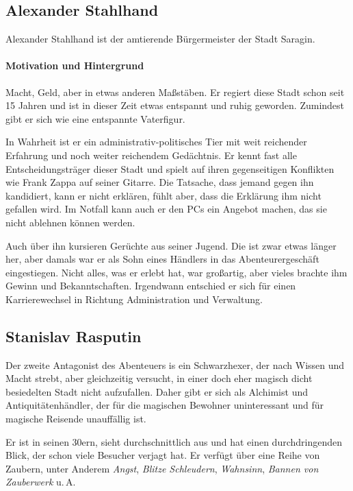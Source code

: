 \documentclass[a4paper,10pt]{scrartcl}
\begin{document}
\bestiarium[name=Viktor Bragin, mag=false, typ=Mensch, grad=5,
In=m85, LP=28, AP=40, St=75, Gw=70]{}

\subsection{Alexander Stahlhand}

Alexander Stahlhand ist der amtierende Bürgermeister der Stadt Saragin. 

\paragraph{Motivation und Hintergrund} Macht, Geld, aber in etwas
anderen Maßstäben. Er regiert diese Stadt schon seit 15 Jahren und ist
in dieser Zeit etwas entspannt und ruhig geworden. Zumindest gibt er
sich wie eine entspannte Vaterfigur.

In Wahrheit ist er ein administrativ-politisches Tier mit weit
reichender Erfahrung und noch weiter reichendem Gedächtnis. Er kennt
fast alle Entscheidungsträger dieser Stadt und spielt auf ihren
gegenseitigen Konflikten wie Frank Zappa auf seiner Gitarre. Die
Tatsache, dass jemand gegen ihn kandidiert, kann er nicht erklären,
fühlt aber, dass die Erklärung ihm nicht gefallen wird. Im Notfall kann
auch er den PCs ein Angebot machen, das sie nicht ablehnen können
werden.

Auch über ihn kursieren Gerüchte aus seiner Jugend. Die ist zwar etwas
länger her, aber damals war er als Sohn eines Händlers in das
Abenteurergeschäft eingestiegen. Nicht alles, was er erlebt hat, war
großartig, aber vieles brachte ihm Gewinn und Bekanntschaften.
Irgendwann entschied er sich für einen Karrierewechsel in Richtung
Administration und Verwaltung.

\subsection{Stanislav Rasputin}

Der zweite Antagonist des Abenteuers is ein Schwarzhexer, der nach
Wissen und Macht strebt, aber gleichzeitig versucht, in einer doch eher
magisch dicht besiedelten Stadt nicht aufzufallen. Daher gibt er sich
als Alchimist und Antiquitätenhändler, der für die magischen Bewohner
uninteressant und für magische Reisende unauffällig ist.

Er ist in seinen 30ern, sieht durchschnittlich aus und hat einen
durchdringenden Blick, der schon viele Besucher verjagt hat. Er verfügt
über eine Reihe von Zaubern, unter Anderem \emph{Angst}, \emph{Blitze
Schleudern}, \emph{Wahnsinn}, \emph{Bannen von Zauberwerk} u.\,A.
\end{document}
